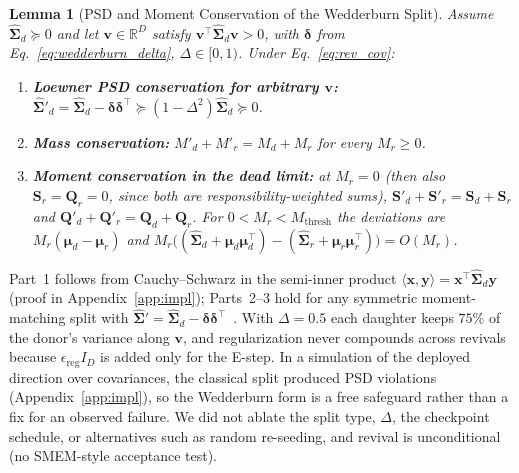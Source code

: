 \documentclass[10pt]{article} %
\newtheorem{lemma}{Lemma}
\newcommand{\R}{\mathbb{R}}
\begin{document}
\begin{lemma}[PSD and Moment Conservation of the Wedderburn Split]
\label{thm:revival}
Assume $\hat{\boldsymbol{\Sigma}}_d \succeq 0$ and let $\mathbf{v} \in \R^D$ satisfy $\mathbf{v}^\top \hat{\boldsymbol{\Sigma}}_d \mathbf{v} > 0$, with $\boldsymbol{\delta}$ from Eq.~\eqref{eq:wedderburn_delta}, $\Delta \in [0, 1)$. Under Eq.~\eqref{eq:rev_cov}:
\begin{enumerate}[leftmargin=*,nosep]
  \item \textbf{Loewner PSD conservation for arbitrary $\mathbf{v}$:} $\hat{\boldsymbol{\Sigma}}'_d = \hat{\boldsymbol{\Sigma}}_d - \boldsymbol{\delta}\boldsymbol{\delta}^\top \succeq (1 - \Delta^2)\hat{\boldsymbol{\Sigma}}_d \succeq 0$.
  \item \textbf{Mass conservation:} $M'_d + M'_r = M_d + M_r$ for every $M_r \ge 0$.
  \item \textbf{Moment conservation in the dead limit:} at $M_r = 0$ (then also $\mathbf{S}_r = \mathbf{Q}_r = 0$, since both are responsibility-weighted sums), $\mathbf{S}'_d + \mathbf{S}'_r = \mathbf{S}_d + \mathbf{S}_r$ and $\mathbf{Q}'_d + \mathbf{Q}'_r = \mathbf{Q}_d + \mathbf{Q}_r$. For $0 < M_r < M_{\mathrm{thresh}}$ the deviations are $M_r(\boldsymbol{\mu}_d - \boldsymbol{\mu}_r)$ and $M_r\bigl((\hat{\boldsymbol{\Sigma}}_d + \boldsymbol{\mu}_d\boldsymbol{\mu}_d^\top) - (\hat{\boldsymbol{\Sigma}}_r + \boldsymbol{\mu}_r\boldsymbol{\mu}_r^\top)\bigr) = O(M_r)$.
\end{enumerate}
\end{lemma}
Part~1 follows from Cauchy--Schwarz in the semi-inner product $\langle \mathbf{x}, \mathbf{y} \rangle = \mathbf{x}^\top \hat{\boldsymbol{\Sigma}}_d \mathbf{y}$ (proof in Appendix~\ref{app:impl}); Parts~2--3 hold for any symmetric moment-matching split with $\hat{\boldsymbol{\Sigma}}' = \hat{\boldsymbol{\Sigma}}_d - \boldsymbol{\delta}\boldsymbol{\delta}^\top$~\citep{zhang2003em,richardson1997bayesian}. With $\Delta = 0.5$ each daughter keeps $75\%$ of the donor's variance along $\mathbf{v}$, and regularization never compounds across revivals because $\epsilon_{\mathrm{reg}} I_D$ is added only for the E-step. In a simulation of the deployed direction over \rSplitTrials{} covariances, the classical split produced \rSplitViolClassical{} PSD violations (Appendix~\ref{app:impl}), so the Wedderburn form is a free safeguard rather than a fix for an observed failure. We did not ablate the split type, $\Delta$, the checkpoint schedule, or alternatives such as random re-seeding, and revival is unconditional (no SMEM-style acceptance test).
\end{document}
